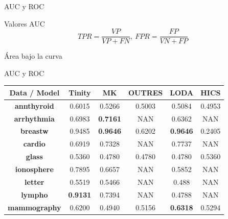 \documentclass[10pt]{beamer}
\begin{document}
\begin{frame}[fragile]{AUC y ROC}
\vspace{10px}

\begin{block}{Valores AUC}
	$$TPR = \frac{VP}{VP + FN}, \ FPR = \frac{FP}{VN + FP}$$
	
	\pause
	
	Área bajo la curva
\end{block}

\end{frame}

\begin{frame}[fragile]{AUC y ROC}
\vspace{10px}

\begin{table}
	\centering
	\begin{tabular}{|c|c|c|c|c|c|} 
		\hline
		\textbf{Data / Model}  & \textbf{Tinity}  & \textbf{MK}      & \textbf{OUTRES}  & \textbf{LODA}    & \textbf{HICS}   \\ 
		\hline
		\textbf{annthyroid}     & 0.6015           & 0.5266           & 0.5003           & 0.5084           & 0.4953          \\ 
		\hline
		\textbf{arrhythmia}     & 0.6983           & \textbf{0.7161}  & NAN              & 0.6362           & NAN             \\ 
		\hline
		\textbf{breastw}        & 0.9485           & \textbf{0.9646}  & 0.6202           & \textbf{0.9646}  & 0.2405          \\ 
		\hline
		\textbf{cardio}         & 0.6919           & 0.7328           & NAN              & 0.7737           & NAN             \\ 
		\hline
		\textbf{glass}          & 0.5360           & 0.4780           & 0.4780           & 0.4780           & 0.5360          \\ 
		\hline
		\textbf{ionosphere}     & 0.7895           & 0.6657           & NAN              & 0.5852           & NAN             \\ 
		\hline
		\textbf{letter}         & 0.5519           & 0.5466           & NAN              & 0.488            & NAN             \\ 
		\hline
		\textbf{lympho}         & \textbf{0.9131}  & 0.7394           & NAN              & 0.4788           & NAN             \\ 
		\hline
		\textbf{mammography}    & 0.6200           & 0.4940           & 0.5156           & \textbf{0.6318}  & 0.5294          \\ 

\end{tabular}
\end{table}
\end{frame}
\end{document}
